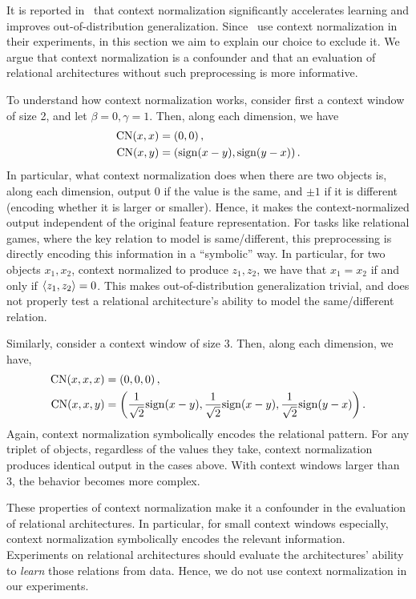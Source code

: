 It is reported in~\citep{webbEmergentSymbols2021,kergNeuralArchitecture2022} that context normalization significantly accelerates learning and improves out-of-distribution generalization. Since~\citep{webbEmergentSymbols2021,kergNeuralArchitecture2022} use context normalization in their experiments, in this section we aim to explain our choice to exclude it. We argue that context normalization is a confounder and that an evaluation of relational architectures without such preprocessing is more informative.

To understand how context normalization works, consider first a context window of size 2, and let $\beta = 0, \gamma = 1$. Then, along each dimension, we have
\begin{align*}
        \mathrm{CN}(x, x) &= \left(0, 0\right),\\
        \mathrm{CN}(x, y) &= \left(\mathrm{sign}(x - y), \mathrm{sign}(y - x)\right).
\end{align*}
In particular, what context normalization does when there are two objects is, along each dimension, output 0 if the value is the same, and $\pm 1$ if it is different (encoding whether it is larger or smaller). Hence, it makes the context-normalized output independent of the original feature representation. For tasks like relational games, where the key relation to model is same/different, this preprocessing is directly encoding this information in a ``symbolic'' way. In particular, for two objects $x_1, x_2$, context normalized to produce $z_1, z_2$, we have that $x_1 = x_2$ if and only if $\left \langle z_1, z_2 \right\rangle = 0$. This makes out-of-distribution generalization trivial, and does not properly test a relational architecture's ability to model the same/different relation.

Similarly, consider a context window of size 3. Then, along each dimension, we have,
\begin{align*}
        \mathrm{CN}(x, x, x) &= \left(0, 0, 0\right),\\
        \mathrm{CN}(x, x, y) &= \left(\frac{1}{\sqrt{2}} \mathrm{sign}(x - y), \frac{1}{\sqrt{2}} \mathrm{sign}(x - y), \frac{1}{\sqrt{2}} \mathrm{sign}(y - x)\right).
\end{align*}
Again, context normalization symbolically encodes the relational pattern. For any triplet of objects, regardless of the values they take, context normalization produces identical output in the cases above. With context windows larger than 3, the behavior becomes more complex.

These properties of context normalization make it a confounder in the evaluation of relational architectures. In particular, for small context windows especially, context normalization symbolically encodes the relevant information. Experiments on relational architectures should evaluate the architectures' ability to \textit{learn} those relations from data. Hence, we do not use context normalization in our experiments.